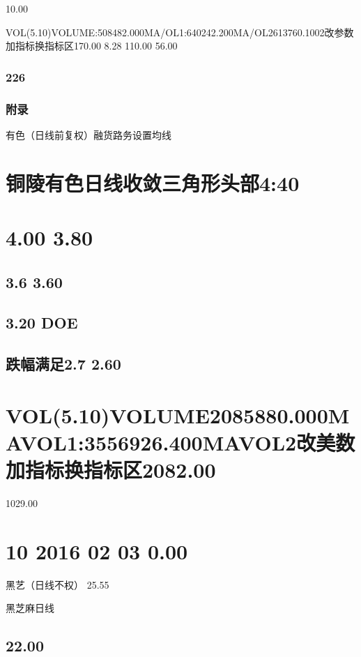 \documentclass{article}
\begin{document}
10.00

VOL(5.10)VOLUME:508482.000MA/OL1:640242.200MA/OL2613760.1002改参数加指标换指标区170.00 8.28 110.00 56.00

\subsubsection{226}

\clearpage

\subsubsection{附录}

有色（日线前复权）融货路务设置均线

\section{铜陵有色日线收敛三角形头部4:40}

\section{4.00 3.80}

\subsection{3.6 3.60}

\subsection{3.20 DOE}

\subsection{跌幅满足2.7 2.60}

\section{VOL(5.10)VOLUME2085880.000MAVOL1:3556926.400MAVOL2改美数加指标换指标区2082.00}

1029.00

\section{10 2016 02 03 0.00}

黑艺（日线不权） 25.55

黑芝麻日线

\subsection{22.00}
\end{document}
